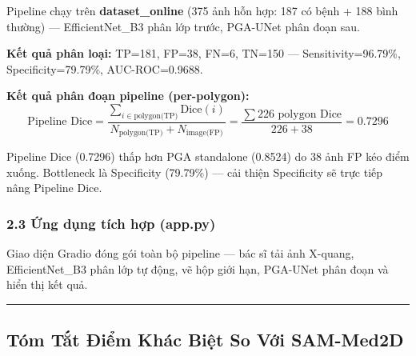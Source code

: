 Pipeline chạy trên \textbf{dataset\_online} (375 ảnh hỗn hợp: 187 có bệnh + 188 bình thường) — EfficientNet\_B3 phân lớp trước, PGA-UNet phân đoạn sau.

\textbf{Kết quả phân loại:} TP=181, FP=38, FN=6, TN=150 — Sensitivity=96.79\%, Specificity=79.79\%, AUC-ROC=0.9688.

\textbf{Kết quả phân đoạn pipeline (per-polygon):}
\[
\text{Pipeline Dice} = \frac{\displaystyle\sum_{i \in \text{polygon(TP)}} \text{Dice}(i)}{N_{\text{polygon(TP)}} + N_{\text{image(FP)}}} = \frac{\sum 226 \text{ polygon Dice}}{226 + 38} = \mathbf{0.7296}
\]

Pipeline Dice (0.7296) thấp hơn PGA standalone (0.8524) do 38 ảnh FP kéo điểm xuống. Bottleneck là Specificity (79.79\%) — cải thiện Specificity sẽ trực tiếp nâng Pipeline Dice.


\subsubsection{2.3 Ứng dụng tích hợp (app.py)}

Giao diện Gradio đóng gói toàn bộ pipeline — bác sĩ tải ảnh X-quang, EfficientNet\_B3 phân lớp tự động, vẽ hộp giới hạn, PGA-UNet phân đoạn và hiển thị kết quả.

\vspace{0.5em}\hrule\vspace{0.5em}


\subsection{Tóm Tắt Điểm Khác Biệt So Với SAM-Med2D}

\begin{table}[htbp]
\centering\renewcommand{\arraystretch}{1.2}
\end{table}

